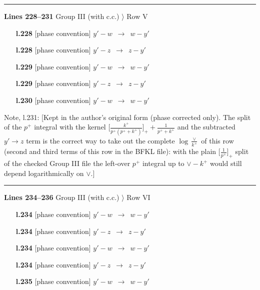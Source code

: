 \documentclass[10pt]{article}
\newenvironment{notebox}{\def\FrameCommand{{\color{notebar}\vrule width 1.5pt}\hspace{6pt}}\MakeFramed{\advance\hsize-\width\FrameRestore}\small}{\endMakeFramed}
\begin{document}
\noindent\rule{\linewidth}{0.3pt}\par\noindent\textbf{Lines 228--231} \quad \textsf{Group III (with c.c.) $\rangle$ Row V} \par
\begin{itemize}[leftmargin=2.2em,itemsep=1pt,topsep=2pt]
\item[\textbf{l.228}] \textsf{\small [phase convention]} $\displaystyle y'-w$\ $\longrightarrow$\ $\displaystyle w-y'$
\item[\textbf{l.228}] \textsf{\small [phase convention]} $\displaystyle y'-z$\ $\longrightarrow$\ $\displaystyle z-y'$
\item[\textbf{l.229}] \textsf{\small [phase convention]} $\displaystyle y'-w$\ $\longrightarrow$\ $\displaystyle w-y'$
\item[\textbf{l.229}] \textsf{\small [phase convention]} $\displaystyle y'-z$\ $\longrightarrow$\ $\displaystyle z-y'$
\item[\textbf{l.230}] \textsf{\small [phase convention]} $\displaystyle y'-w$\ $\longrightarrow$\ $\displaystyle w-y'$
\end{itemize}
\begin{notebox}\textsf{\small Note, l.231:} [Kept in the author's original form (phase corrected only). The split of the $p^{+}$ integral with the kernel $\big[\frac{k^{+}}{p^{+}(p^{+}+k^{+})}\big]_{+}+\frac{1}{p^{+}+k^{+}}$ and the subtracted $y'\to z$ term is the correct way to take out the complete $\log\frac{\vee}{k^{+}}$ of this row (second and third terms of this row in the BFKL file): with the plain $\big[\frac{1}{p^{+}}\big]_{+}$ split of the checked Group III file the left-over $p^{+}$ integral up to $\vee-k^{+}$ would still depend logarithmically on $\vee$.]\end{notebox}
\noindent\rule{\linewidth}{0.3pt}\par\noindent\textbf{Lines 234--236} \quad \textsf{Group III (with c.c.) $\rangle$ Row VI} \par
\begin{itemize}[leftmargin=2.2em,itemsep=1pt,topsep=2pt]
\item[\textbf{l.234}] \textsf{\small [phase convention]} $\displaystyle y'-w$\ $\longrightarrow$\ $\displaystyle w-y'$
\item[\textbf{l.234}] \textsf{\small [phase convention]} $\displaystyle y'-z$\ $\longrightarrow$\ $\displaystyle z-y'$
\item[\textbf{l.234}] \textsf{\small [phase convention]} $\displaystyle y'-w$\ $\longrightarrow$\ $\displaystyle w-y'$
\item[\textbf{l.234}] \textsf{\small [phase convention]} $\displaystyle y'-z$\ $\longrightarrow$\ $\displaystyle z-y'$
\item[\textbf{l.235}] \textsf{\small [phase convention]} $\displaystyle y'-w$\ $\longrightarrow$\ $\displaystyle w-y'$
\end{itemize}
\end{document}
